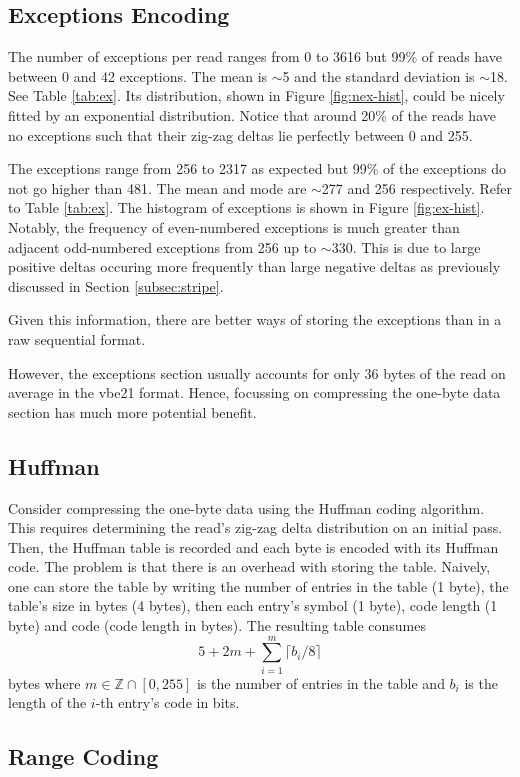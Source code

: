 

\subsection{Exceptions Encoding}

The number of exceptions per read ranges from 0 to 3616 but 99\% of reads have between 0 and 42 exceptions. The mean is $\sim$5 and the standard deviation is $\sim$18. See Table \ref{tab:ex}. Its distribution, shown in Figure \ref{fig:nex-hist}, could be nicely fitted by an exponential distribution. Notice that around 20\% of the reads have no exceptions such that their zig-zag deltas lie perfectly between 0 and 255.




The exceptions range from 256 to 2317 as expected but 99\% of the exceptions do not go higher than 481. The mean and mode are $\sim$277 and 256 respectively. Refer to Table \ref{tab:ex}. The histogram of exceptions is shown in Figure \ref{fig:ex-hist}. Notably, the frequency of even-numbered exceptions is much greater than adjacent odd-numbered exceptions from 256 up to $\sim$330. This is due to large positive deltas occuring more frequently than large negative deltas as previously discussed in Section \ref{subsec:stripe}.



Given this information, there are better ways of storing the exceptions than in a raw sequential format.


However, the exceptions section usually accounts for only 36 bytes of the read on average in the vbe21 format. Hence, focussing on compressing the one-byte data section has much more potential benefit.

\subsection{Huffman}

Consider compressing the one-byte data using the Huffman coding algorithm. This requires determining the read's zig-zag delta distribution on an initial pass. Then, the Huffman table is recorded and each byte is encoded with its Huffman code. The problem is that there is an overhead with storing the table.
Naively, one can store the table by writing the number of entries in the table (1 byte), the table's size in bytes (4 bytes), then each entry's symbol (1 byte), code length (1 byte) and code (code length in bytes). The resulting table consumes
\[ 5 + 2m + \sum_{i=1}^m\lceil b_i / 8 \rceil \]
bytes where $m\in\mathbb{Z}\cap[0,255]$ is the number of entries in the table and $b_i$ is the length of the $i$-th entry's code in bits.

\subsection{Range Coding}
